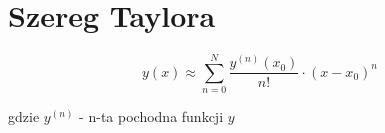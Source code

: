 \section*{Szereg Taylora}

\begin{equation*}
    y(x) \approx \sum_{n = 0}^{N} \frac{y^{(n)}(x_0)}{n!}
    \cdot (x-x_0)^n
\end{equation*}

gdzie $y^{(n)}$ - n-ta pochodna funkcji $y$